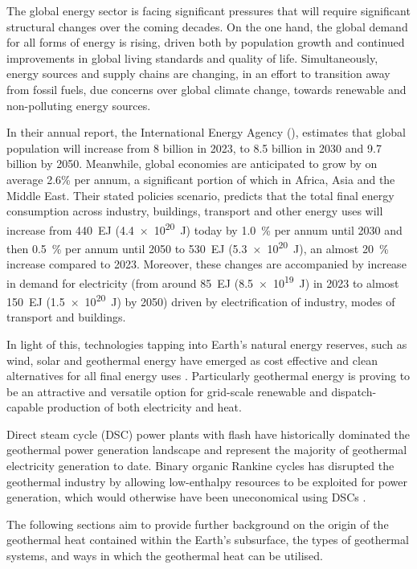 The global energy sector is facing significant pressures that will require significant structural changes over the coming decades. On the one hand, the global demand for all forms of energy is rising, driven both by population growth and continued improvements in global living standards and quality of life. Simultaneously, energy sources and supply chains are changing, in an effort to transition away from fossil fuels, due concerns over global climate change, towards renewable and non-polluting energy sources. 

In their \citeyear{IEA2023} annual report, the International Energy Agency (\citet{IEA2023}), estimates that global population will increase from 8 billion in 2023, to 8.5 billion in 2030 and 9.7 billion by 2050. Meanwhile, global economies are anticipated to grow by on average 2.6\% per annum, a significant portion of which in Africa, Asia and the Middle East. Their stated policies scenario, predicts that the total final energy consumption across industry, buildings, transport and other energy uses will increase from \qty{440}{\exa\joule} (\qty{4.4e20}{\joule}) today by \qty{1.0}{\percent} per annum until 2030 and then \qty{0.5}{\percent} per annum until 2050 to \qty{530}{\exa\joule} (\qty{5.3e20}{\joule}), an almost \qty{20}{\percent} increase compared to 2023. Moreover, these changes are accompanied by increase in demand for electricity (from around \qty{85}{\exa\joule} (\qty{8.5e19}{\joule}) in 2023 to almost \qty{150}{\exa\joule} (\qty{1.5e20}{\joule}) by 2050) driven by electrification of industry, modes of transport and buildings.

In light of this, technologies tapping into Earth's natural energy reserves, such as wind, solar and geothermal energy have emerged as cost effective and clean alternatives for all final energy uses \cite{IEA2023}. Particularly geothermal energy is proving to be an attractive and versatile option for grid-scale renewable and dispatch-capable production of both electricity and heat. 

Direct steam cycle (DSC) power plants with flash have historically dominated the geothermal power generation landscape and represent the majority of geothermal electricity generation to date. Binary organic Rankine cycles has disrupted the geothermal industry by allowing low-enthalpy resources to be exploited for power generation, which would otherwise have been uneconomical using DSCs \cite{DiPippo2016}.

The following sections aim to provide further background on the origin of the geothermal heat contained within the Earth's subsurface, the types of geothermal systems, and ways in which the geothermal heat can be utilised. 

